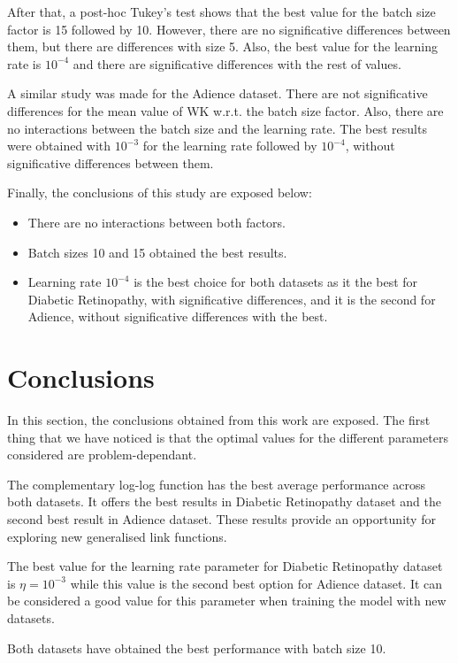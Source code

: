 \documentclass[journal]{IEEEtran}
\begin{document}
	After that, a post-hoc Tukey's test shows that the best value for the batch size factor is 15 followed by 10. However, there are no significative differences between them, but there are differences with size 5. Also, the best value for the learning rate is $10^{-4}$ and there are significative differences with the rest of values.
	
	A similar study was made for the Adience dataset. There are not significative differences for the mean value of WK w.r.t. the batch size factor. Also, there are no interactions between the batch size and the learning rate. The best results were obtained with $10^{-3}$ for the learning rate followed by $10^{-4}$, without significative differences between them.
	
	Finally, the conclusions of this study are exposed below:
	\begin{itemize}
		\item There are no interactions between both factors.
		\item Batch sizes 10 and 15 obtained the best results.
		\item Learning rate $10^{-4}$ is the best choice for both datasets as it the best for Diabetic Retinopathy, with significative differences, and it is the second for Adience, without significative differences with the best. 
	\end{itemize}
	
	\section{Conclusions}
	\label{sect:conclusions}
	In this section, the conclusions obtained from this work are exposed. The first thing that we have noticed is that the optimal values for the different parameters considered are problem-dependant. 
	
	The complementary log-log function has the best average performance across both datasets. It offers the best results in Diabetic Retinopathy dataset and the second best result in Adience dataset. These results provide an opportunity for exploring new generalised link functions.
	
	The best value for the learning rate parameter for  Diabetic Retinopathy dataset is $\eta = 10^{-3}$ while this value is the second best option for Adience dataset. It can be considered a good value for this parameter when training the model with new datasets.
	
	Both datasets have obtained the best performance with batch size 10.
	
\end{document}
